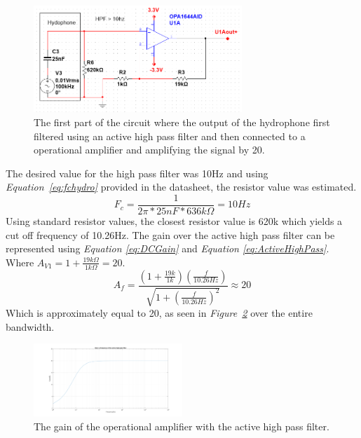 \begin{figure}[h]
    \centering
    \includegraphics[width=0.70\textwidth]{graphics/OPamp1.png}
    \caption{The first part of the circuit where the output of the hydrophone first filtered using an active high pass filter and then connected to a operational amplifier and amplifying the signal by 20.}
    \label{fig:Opamp1}
\end{figure}

\vspace{4cm}

The desired value for the high pass filter was 10Hz and using \textit{Equation~\ref{eq:fchydro}} provided in the datasheet, the resistor value was estimated.   
$$F_c = \frac{1}{2\pi * 25nF * 636k\Omega} = 10Hz$$
Using standard resistor values, the closest resistor value is 620k which yields a cut off frequency of 10.26Hz.
The gain over the active high pass filter can be represented using \textit{Equation \ref{eq:DCGain}} and \textit{Equation \ref{eq:ActiveHighPass}}. 
Where $A_{V1} = 1 + \frac{19k\Omega}{1k\Omega} = 20$.
$$A_f = \frac{(1+\frac{19k}{1k})(\frac{f}{10.26Hz})}{\sqrt{1 + (\frac{f}{10.26Hz})^2}} \approx 20$$
Which is approximately equal to 20, as seen in \textit{Figure~\ref{fig:AVhighpass}} over the entire bandwidth.

\begin{figure}[h]
    \centering
    \includegraphics[width=0.5\textwidth]{graphics/Av_Highpass.png}
    \caption{The gain of the operational amplifier with the active high pass filter.}
    \label{fig:AVhighpass}
\end{figure}

\vspace{4cm}

